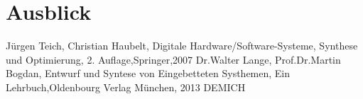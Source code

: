 \documentclass[conference]{IEEEtran}
\begin{document}
\section{Ausblick}

\begin{thebibliography}{00}
 Jürgen Teich, Christian Haubelt, Digitale Hardware/Software-Systeme, Synthese und Optimierung, 2. Auflage,Springer,2007
 Dr.Walter Lange, Prof.Dr.Martin Bogdan, Entwurf und Syntese von Eingebetteten Systhemen, Ein Lehrbuch,Oldenbourg Verlag München, 2013
 DEMICH
\end{thebibliography}
\vspace{12pt}
\end{document}
